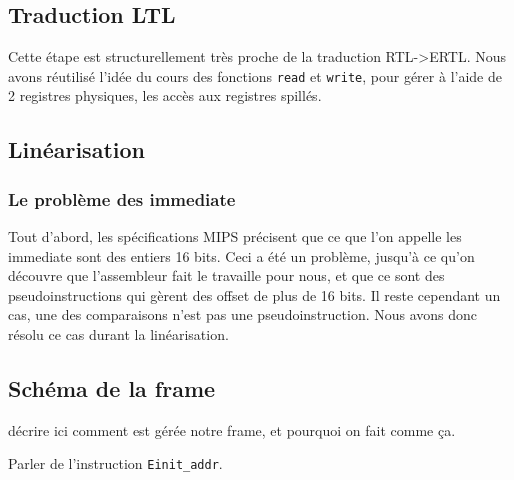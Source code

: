 \documentclass[a4paper]{article}
\begin{document}
\subsection{Traduction LTL}

Cette étape est structurellement très proche de la traduction RTL->ERTL.
Nous avons réutilisé l'idée du cours des fonctions \texttt{read} et
\texttt{write}, pour gérer à l'aide de 2 registres physiques,
les accès aux registres spillés. 

\subsection{Linéarisation}

\subsubsection{Le problème des immediate}
Tout d'abord, les spécifications MIPS précisent que ce que l'on appelle
les
 immediate sont des entiers 16 bits. Ceci a été un problème, jusqu'à ce
 qu'on découvre que l'assembleur fait le travaille pour nous, et que ce
 sont des pseudoinstructions qui gèrent des offset de plus de 16 bits.
 Il reste cependant un cas, une des comparaisons n'est pas une
 pseudoinstruction. Nous avons donc résolu ce cas durant la linéarisation.

 \subsection{Schéma de la frame}

 décrire ici comment est gérée notre frame, et pourquoi on fait comme ça.

 Parler de l'instruction \texttt{Einit\_addr}.
\end{document}
